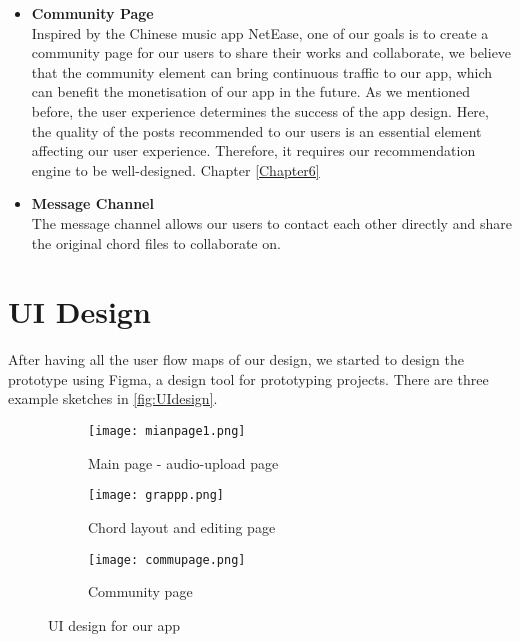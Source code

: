 \begin{itemize}
\item \textbf{Community Page}
\\Inspired by the Chinese music app NetEase, one of our goals is to create a community page for our users to share their works and collaborate, 
we believe that the community element can bring continuous traffic to our app, which can benefit the monetisation of our app in the future.
As we mentioned before, the user experience determines the success of the app design. Here, the quality of the posts recommended to our users is an essential element affecting our user experience. 
Therefore, it requires our recommendation engine to be well-designed. Chapter \ref{Chapter6}

\item \textbf{Message Channel}
\\The message channel allows our users to contact each other directly and share the original chord files to collaborate on.

\end{itemize}

\section{UI Design}
After having all the user flow maps of our design, we started to design the prototype using Figma, a design tool for prototyping projects. 
There are three example sketches in \autoref{fig:UIdesign}. 

\begin{figure}[ht]
     \centering
     \hspace{16mm}
     \begin{subfigure}[b]{0.2\textwidth}
         \centering
         \texttt{[image: mianpage1.png]}
         \caption{Main page - audio-upload page}
         \label{Mainpage}
     \end{subfigure}
     \hfill
     \begin{subfigure}[b]{0.2\textwidth}
         \centering
         \texttt{[image: grappp.png]}
         \caption{Chord layout and editing page}
         \label{chordedit}
     \end{subfigure}
     \hfill
     \begin{subfigure}[b]{0.2\textwidth}
         \centering
         \texttt{[image: commupage.png]}
         \caption{Community page}
         \label{Community page}
     \end{subfigure}
     \hspace{16mm}
        \caption{UI design for our app}
        \label{fig:UIdesign}
\end{figure}

